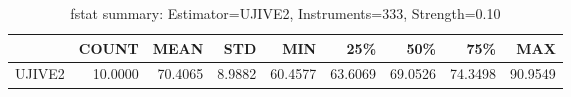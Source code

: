\begin{table}[ht]
\centering
\caption{fstat summary: Estimator=UJIVE2, Instruments=333, Strength=0.10}
\begin{tabular}{lrrrrrrrr}
\toprule
 & COUNT & MEAN & STD & MIN & 25\% & 50\% & 75\% & MAX \\
\midrule
UJIVE2 & 10.0000 & 70.4065 & 8.9882 & 60.4577 & 63.6069 & 69.0526 & 74.3498 & 90.9549 \\
\bottomrule
\end{tabular}
\end{table}
